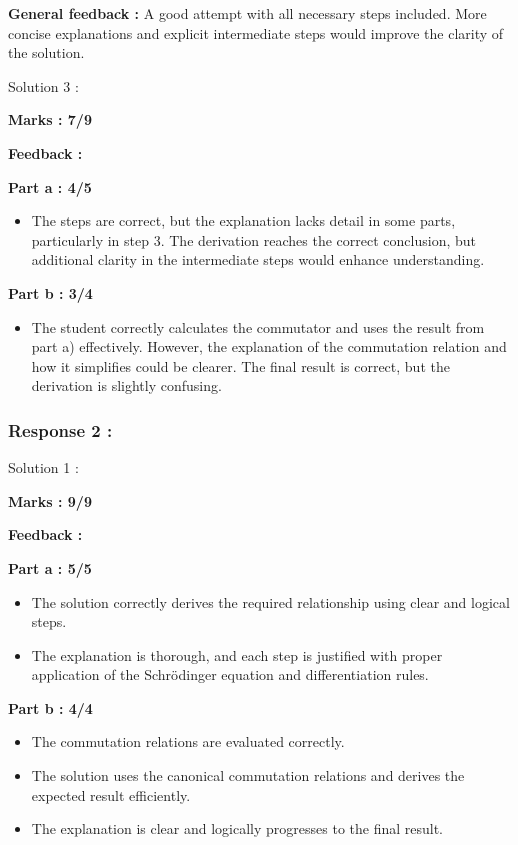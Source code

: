 \documentclass[a4paper,11pt]{article}
\begin{document}
\textbf{General feedback :}
A good attempt with all necessary steps included. More concise explanations and explicit intermediate steps would improve the clarity of the solution.



Solution 3 :

\textbf{Marks : 7/9}

\textbf{Feedback :}

\textbf{Part a : 4/5}

\begin{itemize}
    \item The steps are correct, but the explanation lacks detail in some parts, particularly in step 3. The derivation reaches the correct conclusion, but additional clarity in the intermediate steps would enhance understanding.
\end{itemize}

\textbf{Part b : 3/4}

\begin{itemize}
    \item The student correctly calculates the commutator and uses the result from part a) effectively. However, the explanation of the commutation relation and how it simplifies could be clearer. The final result is correct, but the derivation is slightly confusing.
\end{itemize}



\subsubsection*{Response 2 :}

Solution 1 :

\textbf{Marks : 9/9}

\textbf{Feedback :}

\textbf{Part a : 5/5}

\begin{itemize}
    \item The solution correctly derives the required relationship using clear and logical steps.
    \item The explanation is thorough, and each step is justified with proper application of the Schrödinger equation and differentiation rules.
\end{itemize}

\textbf{Part b : 4/4}

\begin{itemize}
    \item The commutation relations are evaluated correctly.
    \item The solution uses the canonical commutation relations and derives the expected result efficiently.
    \item The explanation is clear and logically progresses to the final result.
\end{itemize}
\end{document}
